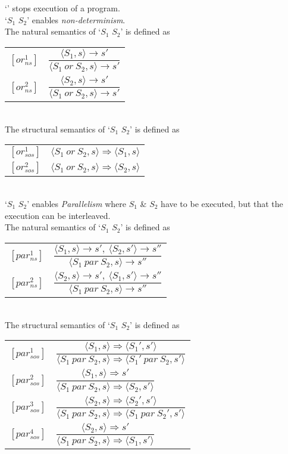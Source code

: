 \documentclass[11pt,a4paper]{article}
\begin{document}
`{}' stops execution of a program.\\

`$S_1$ {} $S_2$' enables \textit{non-determinism}.\\
The natural semantics of `$S_1$ {} $S_2$' is defined as\\
\begin{tabular}{ll}
$[or_{ns}^1]$&$\dfrac{\langle S_1,s\rangle\to s'}{\langle S_1\ or\ S_2,s\rangle\to s'}$\\
$[or_{ns}^2]$&$\dfrac{\langle S_2,s\rangle\to s'}{\langle S_1\ or\ S_2,s\rangle\to s'}$
\end{tabular}\\
The structural semantics of `$S_1$ {} $S_2$' is defined as\\
\begin{tabular}{ll}
$[or_{sos}^1]$&$\langle S_1\ or\ S_2,s\rangle\Rightarrow \langle S_1,s\rangle$\\
$[or_{sos}^2]$&$\langle S_1\ or\ S_2,s\rangle\Rightarrow \langle S_2,s\rangle$
\end{tabular}\\

`$S_1$ {} $S_2$' enables \textit{Parallelism} where $S_1$ \& $S_2$ have to be executed, but that the execution can be interleaved.\\
The natural semantics of `$S_1$ {} $S_2$' is defined as\\
\begin{tabular}{ll}
$[par_{ns}^1]$&$\dfrac{\langle S_1,s\rangle\to s',\ \langle S_2,s'\rangle\to s''}{\langle S_1\ par\ S_2,s\rangle\to s''}$\\
$[par_{ns}^2]$&$\dfrac{\langle S_2,s\rangle\to s',\ \langle S_1,s'\rangle\to s''}{\langle S_1\ par\ S_2,s\rangle\to s''}$
\end{tabular}\\
The structural semantics of `$S_1$ {} $S_2$' is defined as\\
\begin{tabular}{ll}
$[par_{sos}^1]$&$\dfrac{\langle S_1,s\rangle\Rightarrow\langle S_1',s'\rangle}{\langle S_1\ par\ S_2,s\rangle\Rightarrow\langle S_1'\ par\ S_2,s'\rangle}$\\
$[par_{sos}^2]$&$\dfrac{\langle S_1,s\rangle\Rightarrow s'}{\langle S_1\ par\ S_2,s\rangle\Rightarrow\langle S_2,s'\rangle}$\\
$[par_{sos}^3]$&$\dfrac{\langle S_2,s\rangle\Rightarrow\langle S_2',s'\rangle}{\langle S_1\ par\ S_2,s\rangle\Rightarrow\langle S_1\ par\ S_2',s'\rangle}$\\
$[par_{sos}^4]$&$\dfrac{\langle S_2,s\rangle\Rightarrow s'}{\langle S_1\ par\ S_2,s\rangle\Rightarrow\langle S_1,s'\rangle}$
\end{tabular}\\
\end{document}
